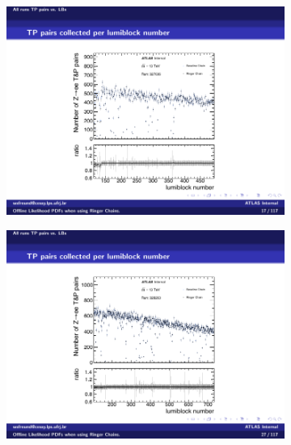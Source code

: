 \begin{figure}[b]
  \centering
\begin{subfigure}[c]{.49\textwidth}
\includegraphics[width=\textwidth]{appendices/figures/pairs_wrt_lb/run327636}%
\caption{\label{fig:run327636}}
\end{subfigure}
\hfill
\begin{subfigure}[c]{.49\textwidth}
\centering
\includegraphics[width=\textwidth]{appendices/figures/pairs_wrt_lb/run328263}%
\caption{\label{fig:run328636}}
\end{subfigure} \\

\end{figure}
